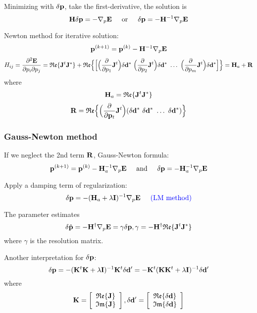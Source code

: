 Minimizing with $\delta\mathbf{p}$, take the first-derivative, the solution is
\[ \mathbf{H}\delta\mathbf{p}=-\nabla_p\mathbf{E} \text{\hspace{5mm}or\hspace{5mm}} \delta\mathbf{p}=-\mathbf{H}^{-1}\nabla_p\mathbf{E} \]

Newton method for iterative solution:
\[ \mathbf{p}^{(k+1)}=\mathbf{p}^{(k)}-\mathbf{H}^{-1}\nabla_p\mathbf{E} \]
\[ H_{ij}=\frac{\partial^2\mathbf{E}}{\partial p_i\partial p_j}=\mathfrak{Re}\{\mathbf{J}^t\mathbf{J}^*\}+\mathfrak{Re}\Big\{\Big[\Big(\frac{\partial}{\partial p_1}\mathbf{J}^t\Big)\delta\mathbf{d}^*~\Big(\frac{\partial}{\partial p_2}\mathbf{J}^t\Big)\delta\mathbf{d}^*~\ldots~\Big(\frac{\partial}{\partial p_m}\mathbf{J}^t\Big)\delta\mathbf{d}^*\Big]\Big\}=\mathbf{H}_a+\mathbf{R} \]
where
\[ \mathbf{H}_a=\mathfrak{Re}\{\mathbf{J}^t\mathbf{J}^*\} \]
\[ \mathbf{R}=\mathfrak{Re}\Big\{\Big(\frac{\partial}{\partial\mathbf{p}_t}\mathbf{J}^t\Big)(\delta\mathbf{d}^*~\delta\mathbf{d}^*~\ldots~\delta\mathbf{d}^*)\Big\} \]

\subsubsection{Gauss-Newton method}
If we neglect the 2nd term $\mathbf{R}$, Gauss-Newton formula:
\[ \mathbf{p}^{(k+1)}=\mathbf{p}^{(k)}-\mathbf{H}_a^{-1}\nabla_p\mathbf{E} \text{\hspace{5mm}and\hspace{5mm}} \delta\mathbf{p}=-\mathbf{H}_a^{-1}\nabla_p\mathbf{E} \]

Apply a damping term of regularization:
\[ \delta\mathbf{p}=-(\mathbf{H}_a+\lambda\mathbf{I})^{-1}\nabla_p\mathbf{E} \text{\hspace{5mm}{\color{blue}(LM method)}}\]

The parameter estimates
\[ \delta\hat{\mathbf{p}}=-\mathbf{H}^\dagger\nabla_p\mathbf{E}=\gamma\delta\mathbf{p},\gamma=-\mathbf{H}^\dagger\mathfrak{Re}\{\mathbf{J}^t\mathbf{J}^*\} \]
where $\gamma$ is the resolution matrix.

Another interpretation for $\delta\mathbf{p}$:
\[ \delta\mathbf{p}=-(\mathbf{K}^t\mathbf{K}+\lambda\mathbf{I})^{-1}\mathbf{K}^t\delta\mathbf{d}^\prime=-\mathbf{K}^t(\mathbf{K}\mathbf{K}^t+\lambda\mathbf{I})^{-1}\delta\mathbf{d}^\prime \]
where
\begin{equation*}
  \mathbf{K}=\left[ \begin{array}{c}
    \mathfrak{Re}\{\mathbf{J}\} \\
    \mathfrak{Im}\{\mathbf{J}\}
  \end{array}\right],
  \delta\mathbf{d}^\prime=\left[ \begin{array}{c}
    \mathfrak{Re}\{\delta\mathbf{d}\} \\
    \mathfrak{Im}\{\delta\mathbf{d}\}
  \end{array}\right]
\end{equation*}

